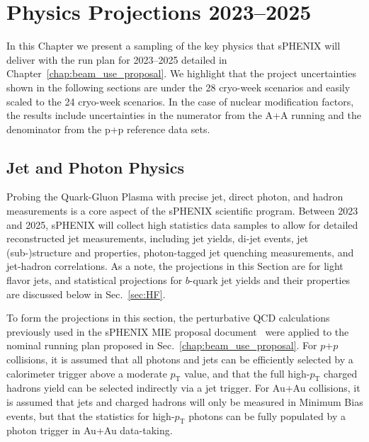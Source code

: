 \chapter{Physics Projections 2023--2025}
\label{chap:physics_projections}

In this Chapter we present a sampling of the key physics that sPHENIX will deliver with the run plan for 2023--2025 detailed in Chapter~\ref{chap:beam_use_proposal}.    We highlight that the project uncertainties shown in the following sections are under the 28 cryo-week scenarios and easily scaled to the 24 cryo-week scenarios.  In the case of nuclear modification factors, the results include uncertainties in the numerator from the A+A running and the denominator from the p+p reference data sets.


\section{Jet and Photon Physics}
\label{sec:jet}

Probing the Quark-Gluon Plasma with precise jet, direct photon, and hadron measurements is a core aspect of the sPHENIX scientific program. Between 2023 and 2025, sPHENIX will collect high statistics data samples to allow for detailed reconstructed jet measurements, including jet yields, di-jet events, jet (sub-)structure and properties, photon-tagged jet quenching measurements, and jet-hadron correlations. As a note, the projections in this Section are for light flavor jets, and statistical projections for $b$-quark jet yields and their properties are discussed below in Sec.~\ref{sec:HF}. 

To form the projections in this section, the perturbative QCD calculations previously used in the sPHENIX MIE proposal document~\cite{Adare:2015kwa} were applied to the nominal running plan proposed in Sec.~\ref{chap:beam_use_proposal}. 
For $p$+$p$ collisions, it is assumed that all photons and jets can be efficiently selected by a calorimeter trigger above a moderate $p_\mathrm{T}$ value, and that the full high-$p_\mathrm{T}$ charged hadrons yield can be selected indirectly via a jet trigger. For Au+Au collisions, it is assumed that jets and charged hadrons will only be measured in Minimum Bias events, but that the statistics for high-$p_\mathrm{T}$ photons can be fully populated by a photon trigger in Au+Au data-taking.

